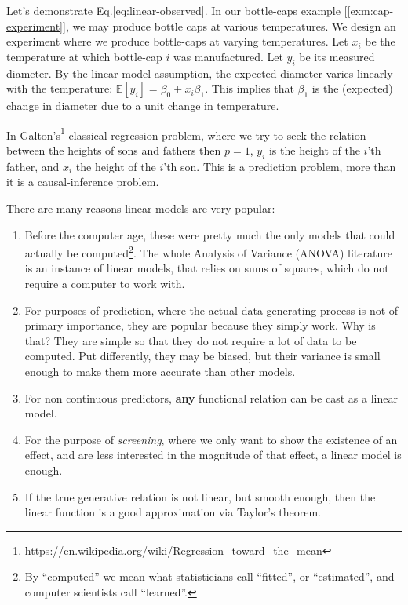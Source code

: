 \documentclass[]{book}
\renewcommand{\href}[2]{#2\footnote{\url{#1}}}
\theoremstyle{definition}
\theoremstyle{definition}
\theoremstyle{definition}
\theoremstyle{remark}
\let\BeginKnitrBlock\begin \let\EndKnitrBlock\end
\begin{document}
Let's demonstrate Eq.\eqref{eq:linear-observed}.
In our bottle-caps example {[}\ref{exm:cap-experiment}{]}, we may produce bottle caps at various temperatures.
We design an experiment where we produce bottle-caps at varying temperatures.
Let \(x_i\) be the temperature at which bottle-cap \(i\) was manufactured.
Let \(y_i\) be its measured diameter.
By the linear model assumption, the expected diameter varies linearly with the temperature: \(\mathbb{E}[y_i]=\beta_0 + x_i \beta_1\).
This implies that \(\beta_1\) is the (expected) change in diameter due to a unit change in temperature.

\BeginKnitrBlock{remark}
{}In \href{https://en.wikipedia.org/wiki/Regression_toward_the_mean}{Galton's} classical regression problem, where we try to seek the relation between the heights of sons and fathers then \(p=1\), \(y_i\) is the height of the \(i\)'th father, and \(x_i\) the height of the \(i\)'th son.
This is a prediction problem, more than it is a causal-inference problem.
\EndKnitrBlock{remark}

There are many reasons linear models are very popular:

\begin{enumerate}
\def\labelenumi{\arabic{enumi}.}
\item
  Before the computer age, these were pretty much the only models that could actually be computed\footnote{By ``computed'' we mean what statisticians call ``fitted'', or ``estimated'', and computer scientists call ``learned''.}.
  The whole Analysis of Variance (ANOVA) literature is an instance of linear models, that relies on sums of squares, which do not require a computer to work with.
\item
  For purposes of prediction, where the actual data generating process is not of primary importance, they are popular because they simply work.
  Why is that?
  They are simple so that they do not require a lot of data to be computed.
  Put differently, they may be biased, but their variance is small enough to make them more accurate than other models.
\item
  For non continuous predictors, \textbf{any} functional relation can be cast as a linear model.
\item
  For the purpose of \emph{screening}, where we only want to show the existence of an effect, and are less interested in the magnitude of that effect, a linear model is enough.
\item
  If the true generative relation is not linear, but smooth enough, then the linear function is a good approximation via Taylor's theorem.
\end{enumerate}
\end{document}

